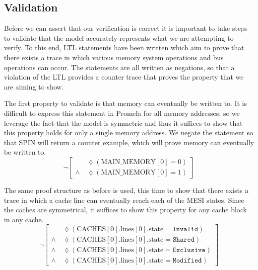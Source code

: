 \documentclass[12pt]{article}
\newcommand{\Eventually}{\lozenge}           %
\begin{document}
\subsection{Validation} \label{model_validation}

Before we can assert that our verification is correct it is important to take steps to validate that the model accurately represents what we are attempting to verify. To this end, LTL statements have been written which aim to prove that there exists a trace in which various memory system operations and bus operations can occur. The statements are all written as negations, so that a violation of the LTL provides a counter trace that proves the property that we are aiming to show.

The first property to validate is that memory can eventually be written to. It is difficult to express this statement in Promela for all memory addresses, so we leverage the fact that the model is symmetric and thus it suffices to show that this property holds for only a single memory address. We negate the statement so that SPIN will return a counter example, which will prove memory can eventually be written to.
\begin{equation}
\neg \left[
\begin{aligned}
          & \Eventually(\text{MAIN\_MEMORY}[0] = 0) \\
    \land\ & \Eventually(\text{MAIN\_MEMORY}[0] = 1)
\end{aligned}
\right]
\end{equation}

The same proof structure as before is used, this time to show that there exists a trace in which a cache line can eventually reach each of the MESI states. Since the caches are symmetrical, it suffices to show this property for any cache block in any cache.
\begin{equation}
\neg \left[
\begin{aligned}
           & \Eventually(\text{CACHES}[0].\text{lines}[0].\text{state} = \texttt{Invalid})   \\
     \land\ & \Eventually(\text{CACHES}[0].\text{lines}[0].\text{state} = \texttt{Shared})    \\
     \land\ & \Eventually(\text{CACHES}[0].\text{lines}[0].\text{state} = \texttt{Exclusive}) \\
     \land\ & \Eventually(\text{CACHES}[0].\text{lines}[0].\text{state} = \texttt{Modified})
\end{aligned}
\right]
\end{equation}
\end{document}
